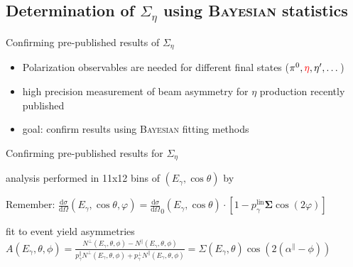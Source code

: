 \documentclass[11pt,aspectratio=169,dvipsnames]{beamer}
\newcommand{\thecolor}{black!70!blue}
\begin{document}
	\subsection{Determination of $\Sigma_\eta$ using \textsc{Bayesian} statistics}
		\begin{frame}{Confirming pre-published results of $\Sigma_\eta$}
		\begin{itemize}
			\item Polarization observables are needed for different final states ($\pi^0,{\color{red}\eta},\eta',\dots$)
			\item high precision measurement of beam asymmetry for $\eta$ production recently published {\cites{eta}}
			\item goal: confirm results using \textsc{Bayesian} fitting methods
		\end{itemize}
		
	\end{frame}
	\begin{frame}{Confirming pre-published results for $\Sigma_\eta$}
		
		\begin{minipage}{\linewidth}
			\begin{tcolorbox}[colback=blue!5,colframe=\thecolor,title={Event selection ($\eta$)}]
				analysis performed in 11x12 bins of $(E_\gamma,\cos\theta)$ by {\cites{eta}}
			\end{tcolorbox}
		\end{minipage}
		\begin{minipage}{\linewidth}
			\begin{tcolorbox}[colback=blue!5,colframe=\thecolor,title={Methods}]
				\begin{center}
					Remember: $\frac{\text{d}\sigma}{\text{d}\Omega}(E_\gamma,\cos\theta,\varphi)=\frac{\text{d}\sigma}{\text{d}\Omega}_0(E_\gamma,\cos\theta)\cdot\left[1-p_\gamma^{\text{lin}}\boldsymbol{\Sigma}\cos(2\varphi)\right]$
				\end{center}
				

					\begin{tcolorbox}[colback=blue!5,colframe=\thecolor,title={Binned fit to event yield asymmetries}]
					fit to event yield asymmetries\\ $A(E_\gamma,\theta,\phi)=\frac{N^\bot(E_\gamma,\theta,\phi)-N^\parallel(E_\gamma,\theta,\phi)}{p_\gamma^\parallel N^\bot(E_\gamma,\theta,\phi) + p_\gamma^\bot N^\parallel(E_\gamma,\theta,\phi)}=\Sigma(E_\gamma,\theta)\cos\left(2\left(\alpha^\parallel-\phi\right)\right)$
							
					\end{tcolorbox}		
					
			\end{tcolorbox}
		\end{minipage}
	\end{frame}
\end{document}
